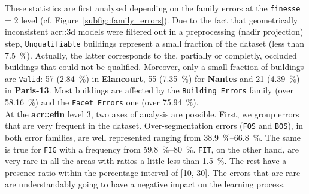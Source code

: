         These statistics are first analysed depending on the family errors at the \texttt{finesse} = 2 level (cf. Figure~\ref{subfig::family_errors}).
        Due to the fact that geometrically inconsistent \gls{acr::3d} models were filtered out in a preprocessing (nadir projection) step, \texttt{Unqualifiable} buildings represent a small fraction of the dataset (less than \SI{7.5}{\percent}).
        Actually, the latter corresponds to the, partially or completly, occluded buildings that could not be qualified.
        Moreover, only a small fraction of buildings are \texttt{Valid}:
        57 (\SI{2.84}{\percent}) in \textbf{Elancourt}, 55 (\SI{7.35}{\percent}) for \textbf{Nantes} and 21 (\SI{4.39}{\percent}) in \textbf{Paris-13}.
        Most buildings are affected by the \texttt{Building Errors} family (over \SI{58.16}{\percent}) and the \texttt{Facet Errors} one (over \SI{75.94}{\percent}).\\

        At the \textbf{\gls{acr::efin}} level 3, two axes of analysis are possible.
        First, we group errors that are very frequent in the dataset.
        Over-segmentation errors (\texttt{FOS} and \texttt{BOS}), in both error families, are well represented ranging from \SIrange{38.9}{66.8}{\percent}.
        The same is true for \texttt{FIG} with a frequency from \SIrange{59.8}{80}{\percent}.
        \texttt{FIT}, on the other hand, are very rare in all the areas with ratios a little less than \SI{1.5}{\percent}.
        The rest have a presence ratio within the percentage interval of [10, 30].
        The errors that are rare are understandably going to have a negative impact on the learning process.\\
        
